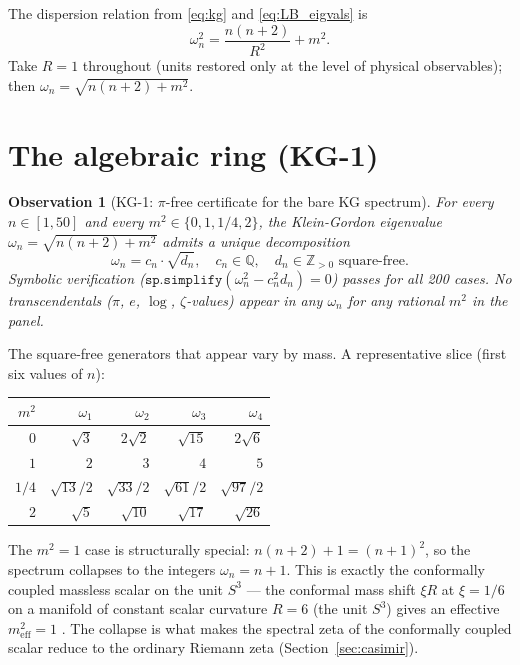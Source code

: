 \documentclass[11pt]{article}
\newtheorem{observation}{Observation}
\begin{document}
The dispersion relation from \eqref{eq:kg} and \eqref{eq:LB_eigvals} is
\begin{equation}
\label{eq:dispersion}
\omega_n^2 = \frac{n(n+2)}{R^2} + m^2.
\end{equation}
Take $R = 1$ throughout (units restored only at the level of physical
observables); then $\omega_n = \sqrt{n(n+2) + m^2}$.

\section{The algebraic ring (KG-1)}
\label{sec:ring}

\begin{observation}[KG-1: $\pi$-free certificate for the bare KG spectrum]
\label{obs:ring}
For every $n \in [1, 50]$ and every $m^2 \in \{0, 1, 1/4, 2\}$, the
Klein-Gordon eigenvalue $\omega_n = \sqrt{n(n+2) + m^2}$ admits a unique
decomposition
\begin{equation}
\label{eq:ring_decomp}
\omega_n = c_n \cdot \sqrt{d_n}, \quad c_n \in \mathbb{Q}, \quad
d_n \in \mathbb{Z}_{>0} \text{ square-free.}
\end{equation}
Symbolic verification ($\mathtt{sp.simplify}(\omega_n^2 - c_n^2 d_n) = 0$)
passes for all 200 cases.  No transcendentals ($\pi$, $e$, $\log$,
$\zeta$-values) appear in any $\omega_n$ for any rational $m^2$ in the
panel.
\end{observation}

The square-free generators that appear vary by mass.  A representative
slice (first six values of $n$):

\begin{center}
\small
\begin{tabular}{r r r r r}
\toprule
$m^2$ & $\omega_1$ & $\omega_2$ & $\omega_3$ & $\omega_4$ \\
\midrule
$0$ & $\sqrt{3}$ & $2\sqrt{2}$ & $\sqrt{15}$ & $2\sqrt{6}$ \\
$1$ & $2$ & $3$ & $4$ & $5$ \\
$1/4$ & $\sqrt{13}/2$ & $\sqrt{33}/2$ & $\sqrt{61}/2$ & $\sqrt{97}/2$ \\
$2$ & $\sqrt{5}$ & $\sqrt{10}$ & $\sqrt{17}$ & $\sqrt{26}$ \\
\bottomrule
\end{tabular}
\end{center}

The $m^2 = 1$ case is structurally special: $n(n+2) + 1 = (n+1)^2$, so
the spectrum collapses to the integers $\omega_n = n + 1$.  This is
exactly the conformally coupled massless scalar on the unit $S^3$ ---
the conformal mass shift $\xi R$ at $\xi = 1/6$ on a manifold of
constant scalar curvature $R = 6$ (the unit $S^3$) gives an effective
$m^2_\text{eff} = 1$ \cite{birrell_davies}.  The collapse is what makes
the spectral zeta of the conformally coupled scalar reduce to the
ordinary Riemann zeta (Section~\ref{sec:casimir}).
\end{document}
